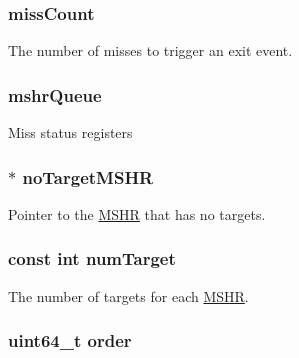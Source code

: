 \label{classBaseCache_af29f0c640654a651bf26558b4b39623b}
\hypertarget{classBaseCache_aec6f1d9f27ecfada36c359137b578352}{
\subsubsection[{missCount}]{ {\bf missCount}}}
\label{classBaseCache_aec6f1d9f27ecfada36c359137b578352}
The number of misses to trigger an exit event. \hypertarget{classBaseCache_aa73933a75144caca7a7d3d77cf285c23}{
\subsubsection[{mshrQueue}]{ {\bf mshrQueue}}}
\label{classBaseCache_aa73933a75144caca7a7d3d77cf285c23}
Miss status registers \hypertarget{classBaseCache_ae429d09cb5301f34a7eb7e6c765d4441}{
\subsubsection[{noTargetMSHR}]{$\ast$ {\bf noTargetMSHR}}}
\label{classBaseCache_ae429d09cb5301f34a7eb7e6c765d4441}
Pointer to the \hyperlink{classMSHR}{MSHR} that has no targets. \hypertarget{classBaseCache_a3c2d74d5455e7b8ccefd3edb38c291de}{
\subsubsection[{numTarget}]{\setlength{\rightskip}{0pt plus 5cm}const int {\bf numTarget}}}
\label{classBaseCache_a3c2d74d5455e7b8ccefd3edb38c291de}
The number of targets for each \hyperlink{classMSHR}{MSHR}. \hypertarget{classBaseCache_ab26c49bd3bef351f3658df29505d78dd}{
\subsubsection[{order}]{\setlength{\rightskip}{0pt plus 5cm}uint64\_\-t {\bf order}}}
